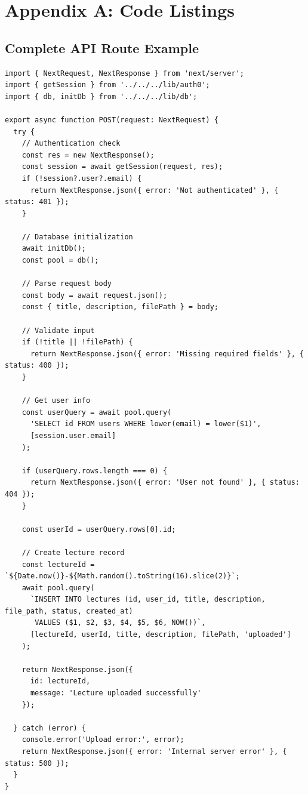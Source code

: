 \documentclass[12pt,a4paper]{article}
\begin{document}
\appendix

\section{Appendix A: Code Listings}

\subsection{Complete API Route Example}

\begin{lstlisting}[caption=Complete API Route Implementation]
import { NextRequest, NextResponse } from 'next/server';
import { getSession } from '../../../lib/auth0';
import { db, initDb } from '../../../lib/db';

export async function POST(request: NextRequest) {
  try {
    // Authentication check
    const res = new NextResponse();
    const session = await getSession(request, res);
    if (!session?.user?.email) {
      return NextResponse.json({ error: 'Not authenticated' }, { status: 401 });
    }

    // Database initialization
    await initDb();
    const pool = db();

    // Parse request body
    const body = await request.json();
    const { title, description, filePath } = body;

    // Validate input
    if (!title || !filePath) {
      return NextResponse.json({ error: 'Missing required fields' }, { status: 400 });
    }

    // Get user info
    const userQuery = await pool.query(
      'SELECT id FROM users WHERE lower(email) = lower($1)',
      [session.user.email]
    );

    if (userQuery.rows.length === 0) {
      return NextResponse.json({ error: 'User not found' }, { status: 404 });
    }

    const userId = userQuery.rows[0].id;

    // Create lecture record
    const lectureId = `${Date.now()}-${Math.random().toString(16).slice(2)}`;
    await pool.query(
      `INSERT INTO lectures (id, user_id, title, description, file_path, status, created_at)
       VALUES ($1, $2, $3, $4, $5, $6, NOW())`,
      [lectureId, userId, title, description, filePath, 'uploaded']
    );

    return NextResponse.json({
      id: lectureId,
      message: 'Lecture uploaded successfully'
    });

  } catch (error) {
    console.error('Upload error:', error);
    return NextResponse.json({ error: 'Internal server error' }, { status: 500 });
  }
}
\end{lstlisting}
\end{document}
